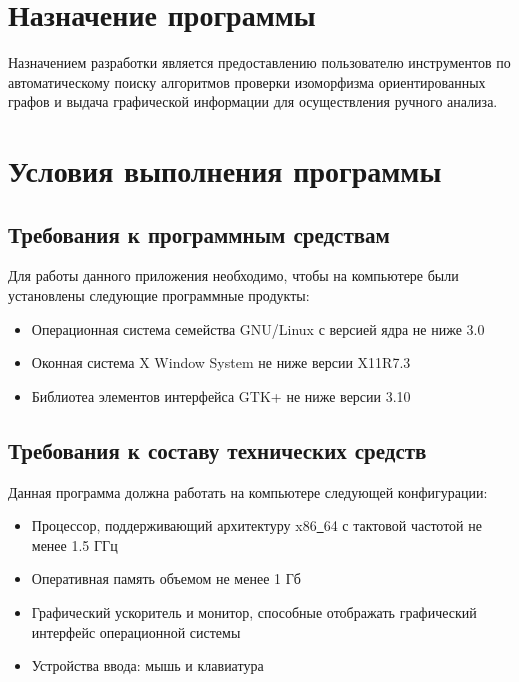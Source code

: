 \documentclass[russian,utf8,emptystyle]{eskdtext}
\begin{document}
\maketitle
\tableofcontents
\newpage

\section{Назначение программы}
Назначением разработки является предоставлению пользователю инструментов по автоматическому поиску алгоритмов проверки изоморфизма ориентированных графов и выдача графической информации для осуществления ручного анализа.

\section{Условия выполнения программы}
\subsection{Требования к программным средствам}
Для работы данного приложения необходимо, чтобы на компьютере были установлены следующие программные продукты:
\begin{itemize}
\item Операционная система семейства GNU/Linux с версией ядра не ниже 3.0
\item Оконная система X Window System не ниже версии X11R7.3
\item Библиотеа элементов интерфейса GTK+ не ниже версии 3.10
\end{itemize}

\subsection{Требования к составу технических средств}
Данная программа должна работать на компьютере следующей конфигурации:
\begin{itemize}
\item Процессор, поддерживающий архитектуру x86\underline{~}64 с тактовой частотой не менее 1.5 ГГц
\item Оперативная память объемом не менее 1 Гб
\item Графический ускоритель и монитор, способные отображать графический интерфейс операционной системы
\item Устройства ввода: мышь и клавиатура
\end{itemize}
\end{document}
